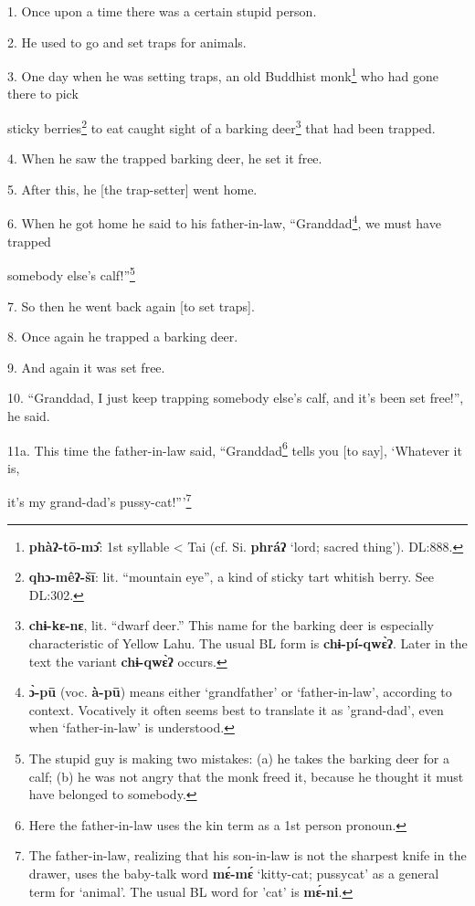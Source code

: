 \setcounter{footnote}{0}

1. Once upon a time there was a certain stupid person.

2. He used to go and set traps for animals.

3. One day when he was setting traps, an old Buddhist monk\footnote{\textbf{phàʔ-tō-mɔ̂}: 1st syllable < Tai (cf. Si. \textbf{phráʔ} `lord; sacred thing'). DL:888.} who had gone there
to pick

sticky berries\footnote{\textbf{qhɔ-mêʔ-šī}: lit. ``mountain eye'', a kind of sticky tart whitish berry. See DL:302.} to eat caught sight of a barking deer\footnote{\textbf{chɨ-kɛ-nɛ}, lit. ``dwarf deer.'' This name for the barking deer is especially characteristic of Yellow Lahu. The usual BL form is \textbf{chɨ-pí-qwɛ̀ʔ}. Later in the text the variant \textbf{chɨ-qwɛ̀ʔ} occurs.} that had been trapped.

4. When he saw the trapped barking deer, he set it free.

5. After this, he [the trap-setter] went home.

6. When he got home he said to his father-in-law, ``Granddad\footnote{\textbf{ɔ̀-pū} (voc. \textbf{à-pū}) means either `grandfather' or `father-in-law', according to context. Vocatively it often seems best to translate it as 'grand-dad', even when `father-in-law' is understood.}, we must have
trapped

somebody else's calf!''\footnote{The stupid guy is making two mistakes: (a) he takes the barking deer for a calf; (b) he was not angry that the monk freed it, because he thought it must have belonged to somebody.}

7. So then he went back again [to set traps].

8. Once again he trapped a barking deer.

9. And again it was set free.

10. ``Granddad, I just keep trapping somebody else's calf, and it's been set free!'',
he said.

11a. This time the father-in-law said, ``Granddad\footnote{Here the father-in-law uses the kin term as a 1st person pronoun.} tells you [to say], `Whatever
it is,

it's my grand-dad's pussy-cat!'''\footnote{The father-in-law, realizing that his son-in-law is not the sharpest knife in the drawer, uses the baby-talk word \textbf{mɛ́-mɛ́} `kitty-cat; pussycat' as a general term for `animal'. The usual BL word for 'cat' is \textbf{mɛ́-ni}.}


